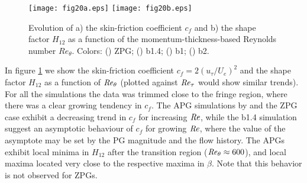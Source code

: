  \begin{figure}
\texttt{[image: fig20a.eps]}
\texttt{[image: fig20b.eps]}
  \caption{Evolution of a) the skin-friction coefficient $c_f$ and b) the shape factor $H_{12}$ as a function of the momentum-thickness-based Reynolds number $Re_{\theta}$.  Colors: (\protect\blackline) ZPG; (\protect\orangeline) b1.4; (\protect\redline) b1; (\protect\greenline) b2.}
\label{fig:cfH12}
\end{figure}
In figure \ref{fig:cfH12} we show the skin-friction coefficient $c_f=2(u_\tau/U_{e})^2$ and the shape factor $H_{12}$ as a function of $\mbox{\textit{Re}}_{\theta}$ (plotted against $\mbox{\textit{Re}}_{\tau}$ would show similar trends). For all the simulations the data was trimmed close to the fringe region, where there was a clear growing tendency in $c_f$. The APG simulations by \cite{bobke2017} and the ZPG case exhibit a decreasing trend in $c_f$ for increasing $\mbox{\textit{Re}}$, while the b1.4 simulation suggest an asymptotic behaviour of $c_f$ for growing $\mbox{\textit{Re}}$, where the value of the asymptote may be set by the PG magnitude and the flow history.
The APGs exhibit local minima in $H_{12}$ after the transition region ($\mbox{\textit{Re}}_{\theta} \approx 600$), and local maxima located very close to the respective maxima in $\beta$. Note that this behavior is not observed for ZPGs.



